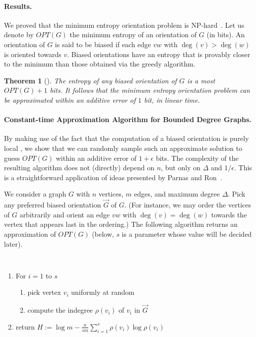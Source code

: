 \documentclass[10pt,a4paper]{article}
\newcommand{\OPT}{OPT}
\newtheorem{theorem}{Theorem}
\begin{document}
\paragraph{Results.}

We proved that the minimum entropy orientation problem is NP-hard~\cite{CFJ08b}. Let us denote by $\OPT(G)$ the minimum entropy of an orientation of $G$ (in bits). An orientation of $G$ is said to be biased if each edge $vw$ with $\deg(v) > \deg(w)$ is oriented towards $v$. Biased orientations have an entropy that is provably closer to the minimum than those obtained via the greedy algorithm.
\begin{theorem}[\cite{CFJ08b}]
\label{th:biased}
The entropy of any biased orientation of $G$ is a most $\OPT(G) + 1$ bits. It follows that the minimum entropy orientation problem can be approximated within an additive error of $1$ bit, in linear time.
\end{theorem}

\paragraph{Constant-time Approximation Algorithm for Bounded Degree Graphs.}

By making use of the fact that the computation of a biased orientation is purely local \cite{local}, we show that we can randomly sample such an approximate solution to guess $\OPT(G)$ within an additive error of $1 + \epsilon$ bits. The complexity of the resulting algorithm does not (directly) depend on $n$, but only on $\Delta$ and $1 / \epsilon$. This is a straightforward application of ideas presented by Parnas and Ron~\cite{PR07}. 

We consider a graph $G$ with $n$ vertices, $m$ edges, and maximum degree $\Delta$. Pick any preferred biased orientation $\overrightarrow{G}$ of $G$. (For instance, we may order the vertices of $G$ arbitrarily and orient an edge $vw$ with $\deg(v) = \deg(w)$ towards the vertex that appears last in the ordering.) The following algorithm returns an approximation of $\OPT(G)$ (below, $s$ is a parameter whose value will be decided later).

{\tt
\begin{enumerate}
\item For $i = 1$ to $s$
\begin{enumerate}
\item pick vertex $v_i$ uniformly at random
\item compute the indegree $\rho (v_i)$ of $v_i$ in $\overrightarrow{G}$
\end{enumerate}
\item return $H := \log m - \frac {n}{sm} \sum_{i=1}^s \rho (v_i) \log \rho (v_i)$
\end{enumerate}
}
\end{document}
